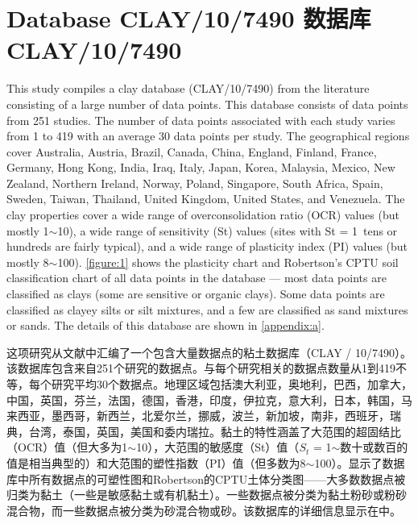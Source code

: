 \section{Database CLAY/10/7490 数据库CLAY/10/7490}

\begin{paracol}{2}
    
    This study compiles a clay database (CLAY/10/7490) from the literature consisting of a large number of data points. This database consists of data points from 251 studies. The number of data points associated with each study varies from 1 to 419 with an average 30 data points per study. The geographical regions cover Australia, Austria, Brazil, Canada, China, England, Finland, France, Germany, Hong Kong, India, Iraq, Italy, Japan, Korea, Malaysia, Mexico, New Zealand, Northern Ireland, Norway, Poland, Singapore, South Africa, Spain, Sweden, Taiwan, Thailand, United Kingdom, United States, and Venezuela. The clay properties cover a wide range of overconsolidation ratio (OCR) values (but mostly 1$\sim$10), a wide range of sensitivity (St) values (sites with St = 1~tens or hundreds are fairly typical), and a wide range of plasticity index (PI) values (but mostly 8$\sim$100). \autoref{figure:1} shows the plasticity chart and Robertson’s CPTU soil classification chart \citep{Robertson1990151} of all data points in the database — most data points are classified as clays (some are sensitive or organic clays). Some data points are classified as clayey silts or silt mixtures, and a few are classified as sand mixtures or sands. The details of this database are shown in \autoref{appendix:a}.
    
    
    \switchcolumn
    
    这项研究从文献中汇编了一个包含大量数据点的粘土数据库（CLAY / 10/7490）。该数据库包含来自251个研究的数据点。与每个研究相关的数据点数量从1到419不等，每个研究平均30个数据点。地理区域包括澳大利亚，奥地利，巴西，加拿大，中国，英国，芬兰，法国，德国，香港，印度，伊拉克，意大利，日本，韩国，马来西亚，墨西哥，新西兰，北爱尔兰，挪威，波兰，新加坡，南非，西班牙，瑞典，台湾，泰国，英国，美国和委内瑞拉。黏土的特性涵盖了大范围的超固结比（OCR）值（但大多为1$\sim$10），大范围的敏感度（St）值（$S_t$ = 1$\sim$数十或数百的值是相当典型的）和大范围的塑性指数（PI）值（但多数为8$\sim$100）。显示了数据库中所有数据点的可塑性图和Robertson的CPTU土体分类图\citep{Robertson1990151}——大多数数据点被归类为黏土（一些是敏感黏土或有机黏土）。一些数据点被分类为黏土粉砂或粉砂混合物，而一些数据点被分类为砂混合物或砂。该数据库的详细信息显示在中。


\end{paracol}
